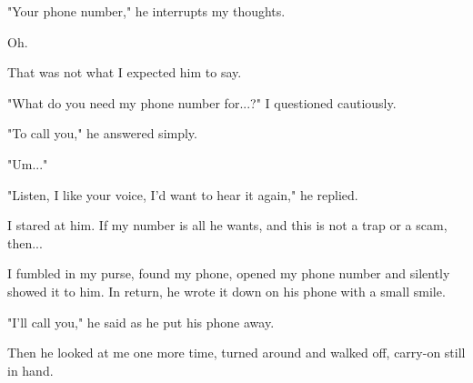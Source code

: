 "Your phone number," he interrupts my thoughts.

Oh.

That was not what I expected him to say.

"What do you need my phone number for...?" I questioned cautiously.

"To call you," he answered simply.

"Um..."

"Listen, I like your voice, I'd want to hear it again," he replied.

I stared at him. If my number is all he wants, and this is not a trap or a scam, then...

I fumbled in my purse, found my phone, opened my phone number and silently showed it to him. In return, he wrote it down on his phone with a small smile.

"I'll call you," he said as he put his phone away.

Then he looked at me one more time, turned around and walked off, carry-on still in hand.